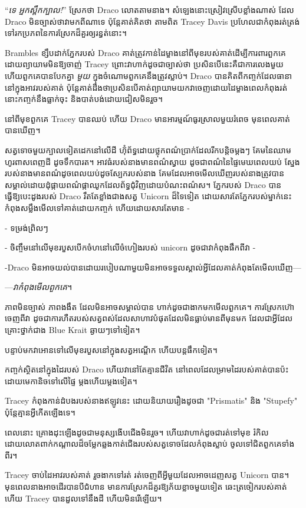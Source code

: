 “\emph{ទេ អ្នកស្ពឹកក្បាល!}” ស្រែកថា Draco លោតតាមនាង។ សំឡេង​នោះ​ស្រៀវ​ស្រើប​ខ្លាំង​ណាស់ ដែល​ Draco មិន​ច្បាស់​ថា​វា​មក​ពី​ណា​ទេ ប៉ុន្តែ​គាត់​គិត​ថា តាម​ពិត Tracey Davis ប្រហែល​ជា​កំពុង​រត់​ត្រង់​ទៅ​រក​ប្រភព​នៃ​ការ​ស្រែក​ដ៏​គួរ​ឲ្យ​រន្ធត់​នោះ។

Brambles ខ្សឹបដាក់ភ្នែករបស់ Draco គាត់ត្រូវកាន់ដៃម្ខាងនៅពីមុខរបស់គាត់ដើម្បីការពារពួកគេ ដោយព្យាយាមមិនឱ្យចាញ់ Tracey ព្រោះវាហាក់ដូចជាច្បាស់ថា ប្រសិនបើនេះគឺជាការលេងមួយ ហើយពួកគេបានបែកគ្នា \emph{មួយ } ក្នុងចំណោមពួកគេនឹងត្រូវស្លាប់។ Draco បានគិតពីកញ្ចក់ដែលធានានៅក្នុងអាវរបស់គាត់ ប៉ុន្តែគាត់ដឹងថាប្រសិនបើគាត់ព្យាយាមយកវាចេញដោយដៃម្ខាងពេលកំពុងរត់ នោះកញ្ចក់នឹងធ្លាក់ចុះ និងបាត់បង់ដោយជៀសមិនរួច។

នៅពីមុខពួកគេ Tracey បានឈប់ ហើយ Draco មានអារម្មណ៍ធូរស្រាលមួយរំពេច មុនពេលគាត់បានឃើញ។

សត្វទោចមួយក្បាលទៀតដេកនៅលើដី ហ៊ុំព័ទ្ធដោយថ្លុកពណ៌ប្រាក់ដែលរីកបន្តិចម្តងៗ គែមនៃឈាមហូរពាសពេញដី ដូចទឹកបារត។ អាវធំរបស់នាងមានពណ៌ស្វាយ ដូចជាពណ៌នៃផ្ទៃមេឃពេលយប់ ស្នែងរបស់នាងមានពណ៌ដូចពេលយប់ដូចស្បែករបស់នាង គែមដែលអាចមើលឃើញរបស់នាងត្រូវបានសម្គាល់ដោយដុំផ្កាយពណ៌ផ្កាឈូកដែលព័ទ្ធជុំវិញដោយបំណះពណ៌ស។ ភ្នែករបស់ Draco បានធ្វើឱ្យបេះដូងរបស់ Draco រឹតតែខ្លាំងជាងសត្វ Unicorn ដ៏ទៃទៀត ដោយសារតែភ្នែករបស់ម្នាក់នេះកំពុងសម្លឹងមើលទៅគាត់ដោយកញ្ចក់ ហើយដោយសារតែមាន -

- ទម្រង់ព្រិលៗ

- ចិញ្ចឹមនៅលើមុខរបួសបើកចំហនៅលើចំហៀងរបស់ unicorn ដូចជាវាកំពុងផឹកពីវា -

-Draco មិន​អាច​យល់​បាន​ដោយ​របៀប​ណា​មួយ​មិន​អាច​ទទួល​ស្គាល់​អ្វី​ដែល​គាត់​កំពុង​តែ​មើល​ឃើញ—

—\emph{វាកំពុងមើលពួកគេ}។

ភាពមិនច្បាស់ ភាពងងឹត ដែលមិនអាចសម្គាល់បាន ហាក់ដូចជាងាកមកមើលពួកគេ។ ការស្រែកហ៊ោចេញពីវា ដូចជាការហឺតរបស់សត្វពស់ដែលសាហាវបំផុតដែលមិនធ្លាប់មានពីមុនមក ដែលជាអ្វីដែលគ្រោះថ្នាក់ជាង Blue Krait ឆ្ងាយៗទៅទៀត។

បន្ទាប់​មក​វា​អោន​ទៅ​លើ​មុខ​របួស​នៅ​ក្នុង​សត្វ​អណ្តើក ហើយ​បន្ត​ផឹក​ទៀត។

កញ្ចក់ស្ថិតនៅក្នុងដៃរបស់ Draco ហើយវានៅតែគ្មានជីវិត នៅពេលដែលម្រាមដៃរបស់គាត់បានប៉ះដោយមេកានិចទៅលើផ្ទៃ ម្តងហើយម្តងទៀត។

Tracey កំពុងកាន់ដំបងរបស់នាងឥឡូវនេះ ដោយនិយាយរឿងដូចជា "Prismatis" និង "Stupefy" ប៉ុន្តែគ្មានអ្វីកើតឡើងទេ។

ពេល​នោះ គ្រោង​ដុះ​ឡើង​ដូច​ជា​មនុស្ស​ងើប​ជើង​មិន​រួច។ ហើយវាហាក់ដូចជារត់ទៅមុខ រំកិលដោយលោតពាក់កណ្តាលដ៏ចម្លែកឆ្លងកាត់ជើងរបស់សត្វទោចដែលកំពុងស្លាប់ ចូលទៅជិតពួកគេទាំងពីរ។

Tracey ចាប់ដៃអាវរបស់គាត់ រួចងាកទៅរត់ រត់ចេញពីអ្វីមួយដែលអាចដេញសត្វ Unicorn បាន។ មុនពេលនាងអាចដើរបានបីជំហាន មានការស្រែកដ៏គួរឱ្យភ័យខ្លាចមួយទៀត ឆេះត្រចៀករបស់គាត់ ហើយ Tracey បានដួលទៅនឹងដី ហើយមិនរើឡើយ។

